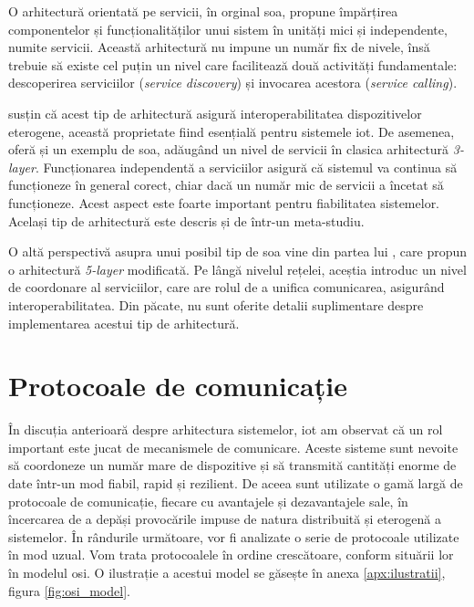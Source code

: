 O arhitectură orientată pe servicii, în orginal \acrfull{soa}, propune împărțirea componentelor și funcționalităților unui sistem în unități mici și independente, numite servicii. Această arhitectură nu impune un număr fix de nivele, însă trebuie să existe cel puțin un nivel care facilitează două activități fundamentale: descoperirea serviciilor (\textit{service discovery}) și invocarea acestora (\textit{service calling}). 

\citet{Khodadadi2016} susțin că acest tip de arhitectură asigură interoperabilitatea dispozitivelor eterogene, această proprietate fiind esențială pentru sistemele \acrshort{iot}. De asemenea, oferă și un exemplu de \acrshort{soa}, adăugând un nivel de servicii în clasica arhitectură \textit{3-layer}. Funcționarea independentă a serviciilor asigură că sistemul va continua să funcționeze în general corect, chiar dacă un număr mic de servicii a încetat să funcționeze. Acest aspect este foarte important pentru fiabilitatea sistemelor. Același tip de arhitectură este descris și de \citet{Lin2017} într-un meta-studiu.

O altă perspectivă asupra unui posibil tip de \acrshort{soa} vine din partea lui \citet{LuTan2010}, care propun o arhitectură \textit{5-layer} modificată. Pe lângă nivelul rețelei, aceștia introduc un nivel de coordonare al serviciilor, care are rolul de a unifica comunicarea, asigurând interoperabilitatea. Din păcate, nu sunt oferite detalii suplimentare despre implementarea acestui tip de arhitectură.

\section{Protocoale de comunicație}

În discuția anterioară despre arhitectura sistemelor, \acrshort{iot} am observat că un rol important este jucat de mecanismele de comunicare. Aceste sisteme sunt nevoite să coordoneze un număr mare de dispozitive și să transmită cantități enorme de date într-un mod fiabil, rapid și rezilient. De aceea sunt utilizate o gamă largă de protocoale de comunicație, fiecare cu avantajele și dezavantajele sale, în încercarea de a depăși provocările impuse de natura distribuită și eterogenă a sistemelor. În rândurile următoare, vor fi analizate o serie de protocoale utilizate în mod uzual. Vom trata protocoalele în ordine crescătoare, conform situării lor în modelul \acrshort{osi}. O ilustrație a acestui model se găsește în anexa \ref{apx:ilustratii}, figura \ref{fig:osi_model}.

